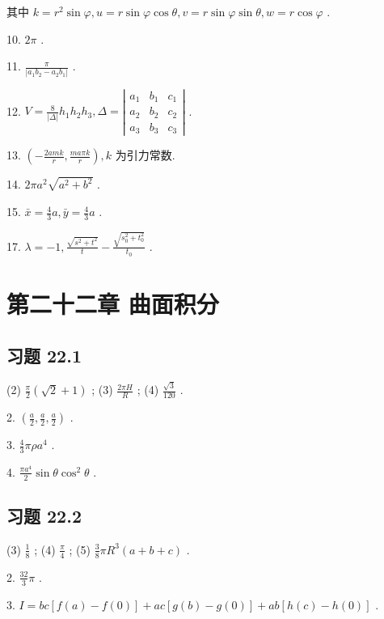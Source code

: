 其中 \(k = {r}^{2}\sin \varphi ,u = r\sin \varphi \cos \theta ,v = r\sin \varphi \sin \theta ,w = r\cos \varphi\) .

10. \({2\pi }\) .

11. \(\frac{\pi }{\left| {a}_{1}{b}_{2} - {a}_{2}{b}_{1}\right| }\) .

12. \(V = \frac{8}{\left| \Delta \right| }{h}_{1}{h}_{2}{h}_{3},\Delta  = \left| \begin{array}{lll} {a}_{1} & {b}_{1} & {c}_{1} \\  {a}_{2} & {b}_{2} & {c}_{2} \\  {a}_{3} & {b}_{3} & {c}_{3} \end{array}\right|\) .

13. \(\left( {-\frac{2amk}{r},\frac{ma\pi k}{r}}\right) ,k\) 为引力常数.

14. \({2\pi }{a}^{2}\sqrt{{a}^{2} + {b}^{2}}\) .

15. \(\bar{x} = \frac{4}{3}a,\bar{y} = \frac{4}{3}a\) .

17. \(\lambda  =  - 1,\frac{\sqrt{{s}^{2} + {t}^{2}}}{t} - \frac{\sqrt{{s}_{0}^{2} + {t}_{0}^{2}}}{{t}_{0}}\) .

\section{第二十二章 曲面积分}

\subsection{习题 22.1}

(2) \(\frac{\pi }{2}\left( {\sqrt{2} + 1}\right)\) ; (3) \(\frac{2\pi H}{R}\) ; (4) \(\frac{\sqrt{3}}{120}\) .

2. \(\left( {\frac{a}{2},\frac{a}{2},\frac{a}{2}}\right)\) .

3. \(\frac{4}{3}{\pi \rho }{a}^{4}\) .

4. \(\frac{\pi {a}^{4}}{2}\sin \theta {\cos }^{2}\theta\) .

\subsection{习题 22.2}

(3) \(\frac{1}{8}\) ; (4) \(\frac{\pi }{4}\) ; (5) \(\frac{3}{8}\pi {R}^{3}\left( {a + b + c}\right)\) .

2. \(\frac{32}{3}\pi\) .

3. \(I = {bc}\left\lbrack  {f\left( a\right)  - f\left( 0\right) }\right\rbrack   + {ac}\left\lbrack  {g\left( b\right)  - g\left( 0\right) }\right\rbrack   + {ab}\left\lbrack  {h\left( c\right)  - h\left( 0\right) }\right\rbrack\) .

